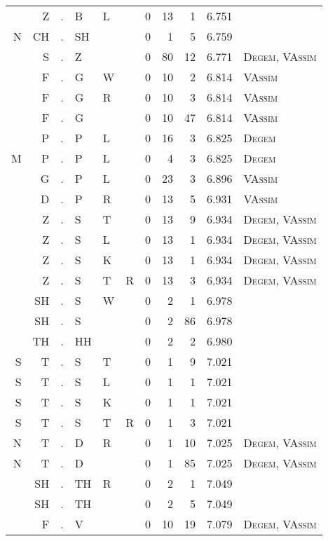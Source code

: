 \begin{longtable}{r@{ } r@{ } c@{ } l@{ } l@{ } l@{ } r r r r l }
  & Z & . & B & L &   & 0 & 13 & 1 & 6.751 &  \\
N & CH & . & SH &   &   & 0 & 1 & 5 & 6.759 &  \\
  & S & . & Z &   &   & 0 & 80 & 12 & 6.771 & \textsc{Degem}, \textsc{VAssim} \\
  & F & . & G & W &   & 0 & 10 & 2 & 6.814 & \textsc{VAssim} \\
  & F & . & G & R &   & 0 & 10 & 3 & 6.814 & \textsc{VAssim} \\
  & F & . & G &   &   & 0 & 10 & 47 & 6.814 & \textsc{VAssim} \\
  & P & . & P & L &   & 0 & 16 & 3 & 6.825 & \textsc{Degem} \\
M & P & . & P & L &   & 0 & 4 & 3 & 6.825 & \textsc{Degem} \\
  & G & . & P & L &   & 0 & 23 & 3 & 6.896 & \textsc{VAssim} \\
  & D & . & P & R &   & 0 & 13 & 5 & 6.931 & \textsc{VAssim} \\
  & Z & . & S & T &   & 0 & 13 & 9 & 6.934 & \textsc{Degem}, \textsc{VAssim} \\
  & Z & . & S & L &   & 0 & 13 & 1 & 6.934 & \textsc{Degem}, \textsc{VAssim} \\
  & Z & . & S & K &   & 0 & 13 & 1 & 6.934 & \textsc{Degem}, \textsc{VAssim} \\
  & Z & . & S & T & R & 0 & 13 & 3 & 6.934 & \textsc{Degem}, \textsc{VAssim} \\
  & SH & . & S & W &   & 0 & 2 & 1 & 6.978 &  \\
  & SH & . & S &   &   & 0 & 2 & 86 & 6.978 &  \\
  & TH & . & HH &   &   & 0 & 2 & 2 & 6.980 &  \\
S & T & . & S & T &   & 0 & 1 & 9 & 7.021 &  \\
S & T & . & S & L &   & 0 & 1 & 1 & 7.021 &  \\
S & T & . & S & K &   & 0 & 1 & 1 & 7.021 &  \\
S & T & . & S & T & R & 0 & 1 & 3 & 7.021 &  \\
N & T & . & D & R &   & 0 & 1 & 10 & 7.025 & \textsc{Degem}, \textsc{VAssim} \\
N & T & . & D &   &   & 0 & 1 & 85 & 7.025 & \textsc{Degem}, \textsc{VAssim} \\
  & SH & . & TH & R &   & 0 & 2 & 1 & 7.049 &  \\
  & SH & . & TH &   &   & 0 & 2 & 5 & 7.049 &  \\
  & F & . & V &   &   & 0 & 10 & 19 & 7.079 & \textsc{Degem}, \textsc{VAssim} \\

\end{longtable}
